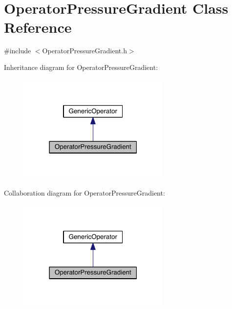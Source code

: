 \hypertarget{class_operator_pressure_gradient}{}\section{Operator\+Pressure\+Gradient Class Reference}
\label{class_operator_pressure_gradient}


{\ttfamily \#include $<$Operator\+Pressure\+Gradient.\+h$>$}



Inheritance diagram for Operator\+Pressure\+Gradient\+:\nopagebreak
\begin{figure}[H]
\begin{center}
\leavevmode
\includegraphics[width=214pt]{d9/dd1/class_operator_pressure_gradient__inherit__graph}
\end{center}
\end{figure}


Collaboration diagram for Operator\+Pressure\+Gradient\+:\nopagebreak
\begin{figure}[H]
\begin{center}
\leavevmode
\includegraphics[width=214pt]{d2/d29/class_operator_pressure_gradient__coll__graph}
\end{center}
\end{figure}
